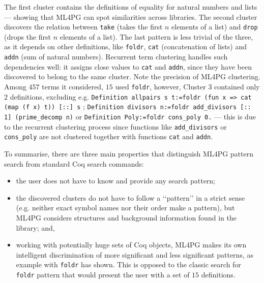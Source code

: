 The first cluster contains the definitions of equality for natural numbers and lists --- showing that 
ML4PG can spot similarities across libraries. The second cluster discovers the relation between \lstinline?take? (takes the first $n$ elements of 
a list) and \lstinline?drop? (drops the first $n$ elements of a list). %
The last pattern is less trivial of the three, as it depends on 
other definitions, like \lstinline?foldr?, \lstinline?cat? (concatenation of lists) and \lstinline?addn? (sum
of natural numbers). 
Recurrent term clustering handles such dependencies well: it assigns close values to \lstinline?cat? and \lstinline?addn?,  since they have been discovered to belong to the same cluster. %
Note the precision of ML4PG clustering. Among $457$ terms it considered, $15$ used \lstinline?foldr?, however,  Cluster 3 contained only $2$ definitions, excluding e.g. %
\lstinline?Definition allpairs s t:=foldr (fun x => cat (map (f x) t)) [::] s? ; \lstinline?Definition divisors n:=foldr add_divisors [:: 1] (prime_decomp n)?  or \lstinline?Definition Poly:=foldr cons_poly 0.? --- this is due to the recurrent clustering process since functions like \lstinline?add_divisors? or \lstinline?cons_poly? are not clustered together with functions \lstinline?cat? and \lstinline?addn?. 

To summarise, there are three main properties that distinguish ML4PG pattern search from standard Coq search commands:
\begin{itemize}
	\item the user does not have to know and provide any search pattern;
	\item the discovered clusters do not have to follow a \lq\lq{}pattern\rq\rq{} in a strict sense (e.g. neither exact symbol names nor their order make a pattern), but ML4PG considers structures and background information found in the library; and,
	\item working with potentially huge sets of Coq objects, ML4PG makes its own intelligent discrimination of more significant and less significant patterns, 
	as example with \lstinline?foldr? has shown. This is opposed to the classic search for \lstinline?foldr? pattern that would present the user with a set of $15$ definitions.
\end{itemize}


